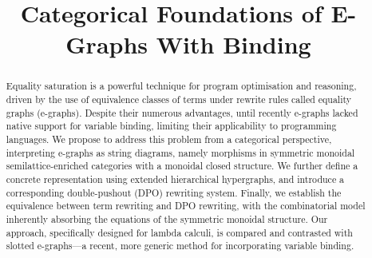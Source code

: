 \documentclass[acmsmall,screen, nonacm, review, anonymous]{acmart}
\title{Categorical Foundations of E-Graphs With Binding}
\begin{document}
\begin{abstract}
	Equality saturation is a powerful technique for program optimisation and reasoning, driven by the use of equivalence classes of terms under rewrite rules called equality graphs (e-graphs).
	Despite their numerous advantages, until recently e-graphs lacked native support for variable binding, limiting their applicability to programming languages.
	We propose to address this problem from a categorical perspective, interpreting e-graphs as string diagrams, namely morphisms in symmetric monoidal semilattice-enriched categories with a monoidal closed structure.
	We further define a concrete representation using extended hierarchical hypergraphs, and introduce a corresponding double-pushout (DPO) rewriting system.
	Finally, we establish the equivalence between term rewriting and DPO rewriting, with the combinatorial model inherently absorbing the equations of the symmetric monoidal structure.
	Our approach, specifically designed for lambda calculi, is compared and contrasted with slotted e-graphs—a recent, more generic method for incorporating variable binding.
\end{abstract}

\maketitle






\end{document}

